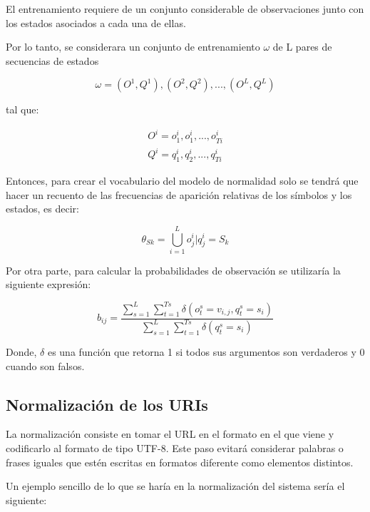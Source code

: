 El entrenamiento requiere de un conjunto considerable de observaciones  junto con los estados asociados a cada una de ellas.

Por lo tanto, se considerara un conjunto de entrenamiento $\omega$ de L pares de secuencias de estados

\begin{equation}
\omega = {(O^{1},Q^{1}),(O^{2},Q^{2}),...,(O^{L},Q^{L})}
\end{equation}

tal que:

\begin{equation}
\begin{aligned}
O^{i} = {o_{1}^{i},o_{1}^{i},...,o_{Ti}^{i}} \\
Q^{i} = {q_{1}^{i},q_{2}^{i},...,q_{Ti}^{i}}
\end{aligned}
\end{equation}

Entonces, para crear el vocabulario del modelo de normalidad solo se tendrá que hacer un recuento de las frecuencias de aparición relativas de los símbolos y los estados, es decir:

\begin{equation}
\theta_{Sk} = \bigcup\limits_{i=1}^{L} {o_{j}^{i}|q_{j}^{i} = S_{k}}
\end{equation}

Por otra parte, para calcular la probabilidades de observación se utilizaría la siguiente expresión:

\begin{equation}\label{eq:entrenamiento}
b_{ij} = \frac{\sum_{s=1}^{L}\sum_{t=1}^{Ts}\delta(o_{t}^{s} = v_{i,j} ,q_{t}^{s} = s_{i} )}{\sum_{s=1}^{L}\sum_{t=1}^{Ts}\delta(q_{t}^{s} = s_{i}) }
\end{equation}

Donde, $\delta$ es una función que retorna 1 si todos sus argumentos son verdaderos y 0 cuando son falsos.

\subsection*{Normalización de los URIs}
\label{sec:normalizacion}

La normalización consiste en tomar el URL en el formato en el que viene y codificarlo al formato de tipo UTF-8. Este paso evitará considerar palabras o frases iguales que estén escritas en formatos diferente como elementos distintos. 

Un ejemplo sencillo de lo que se haría en la normalización del sistema sería el siguiente:

